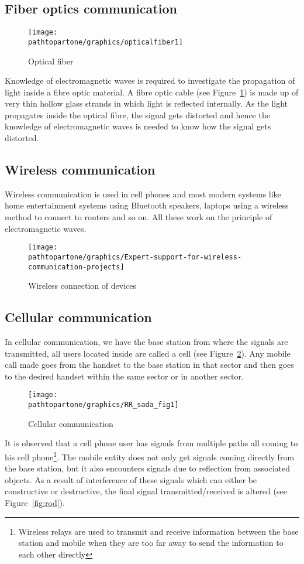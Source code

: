 \subsection{Fiber optics communication}
\begin{figure}[h]
\centering
\texttt{[image: \\pathtopartone/graphics/opticalfiber1]}
\caption{Optical fiber}
\label{fig:opticalfibre1}
\end{figure}

Knowledge of electromagnetic waves is required to investigate the propagation of light inside a fibre optic material. A fibre optic cable (see Figure~\ref{fig:opticalfibre1}) is made up of very thin hollow glass strands in which light is reflected internally. As the light propagates inside the optical fibre, the signal gets distorted and hence the knowledge of electromagnetic waves is needed to know how the signal gets distorted.

\subsection{Wireless communication}
Wireless communication is used in cell phones and most modern systems like home entertainment systems using Bluetooth speakers, laptops using a wireless method to connect to routers and so on. All these work on the principle of electromagnetic waves.
\begin{figure}[h]
\centering
\texttt{[image: \\pathtopartone/graphics/Expert-support-for-wireless-communication-projects]}
\caption{Wireless connection of devices}
\end{figure}

\subsection{Cellular communication} 
In cellular communication, we have the base station from where the signals are transmitted, all users located inside are called a cell (see Figure~\ref{fig:rrsadafig1}). Any mobile call made goes from the handset to the base station in that sector and then goes to the desired handset within the same sector or in another sector.
\begin{figure}[h]
\centering
\texttt{[image: \\pathtopartone/graphics/RR\_sada\_fig1]}
\caption{Cellular communication}
\label{fig:rrsadafig1}
\end{figure}

It is observed that a cell phone user has signals from multiple paths all coming to his cell phone\footnote{Wireless relays are used to transmit and receive information between the base station and mobile when they are too far away to send the information to each other directly}. The mobile entity does not only get signals coming directly from the base station, but it also encounters signals due to reflection from associated objects. As a result of interference of these signals which can either be constructive or destructive, the final signal transmitted/received is altered (see Figure~\ref{fig:rod}). 

